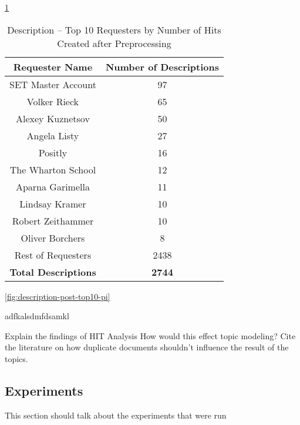 \documentclass[letterpaper,12pt]{article}
\begin{document}
\ref{tab:description_requester_top_10}
\begin{table}
	\caption{\label{tab:description_requester_top_10} Description -- Top 10 Requesters by Number of Hits Created after Preprocessing}
	\begin{center}
		\begin{tabular}{| c | c |}
				\hline
				\textbf{Requester Name} &  \textbf{Number of Descriptions} \\
				\hline
				SET Master Account &              97 \\
				\hline
				Volker Rieck       &              65 \\
				\hline
				Alexey Kuznetsov   &              50 \\
				\hline
				Angela Listy       &              27 \\
				\hline
				Positly            &              16 \\
				\hline
				The Wharton School &              12 \\
				\hline
				Aparna Garimella   &              11 \\
				\hline
				Lindsay Kramer     &              10 \\
				\hline
				Robert Zeithammer  &              10 \\
				\hline
				Oliver Borchers    &               8 \\
				\hline
				Rest of Requesters &            2438 \\
				\hline
				\textbf{Total Descriptions} &  \textbf{2744} \\
				\hline
		\end{tabular}
	\end{center}
\end{table}

\ref{fig:description-post-top10-pi}

\newpage

adfkalsdmfdsamkl

Explain the findings of HIT Analysis
How would this effect topic modeling?
Cite the literature on how duplicate documents shouldn't influence the result of the topics.

\newpage
\subsection{Experiments}
This section should talk about the experiments that were run
\end{document}
